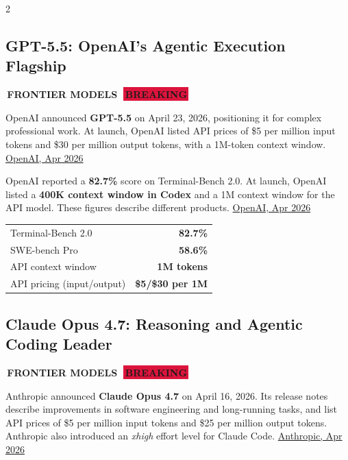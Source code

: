 \documentclass[10pt, a4paper]{article}
\newcommand{\sectiontag}[1]{%
  \noindent\colorbox{cobalt}{%
    \,\footnotesize\bfseries\color{white}\MakeUppercase{#1}\,}\,%
}
\newcommand{\hottag}{%
  \colorbox{crimson}{\,\scriptsize\bfseries\color{white}BREAKING\,}\ %
}
\newcommand{\ruled}{%
  \par\vspace{0.3em}%
  \noindent{\color{electric}\rule{\linewidth}{0.4pt}}\par
  \vspace{0.3em}}
\begin{document}
\begin{multicols}{2}

\subsection{GPT-5.5: OpenAI's Agentic Execution Flagship}

\sectiontag{Frontier Models}\quad\hottag

\medskip
{\small
OpenAI announced \textbf{GPT-5.5} on April 23, 2026, positioning it for complex professional work. At launch, OpenAI listed API prices of \$5 per million input tokens and \$30 per million output tokens, with a 1M-token context window.
\href{https://openai.com/index/introducing-gpt-5-5/}{OpenAI, Apr 2026}

OpenAI reported a \textbf{82.7\%} score on Terminal-Bench 2.0. At launch, OpenAI listed a \textbf{400K context window in Codex} and a 1M context window for the API model. These figures describe different products.
\href{https://openai.com/index/introducing-gpt-5-5/}{OpenAI, Apr 2026}
}

\begin{statbox}[title={\faChartLine\quad GPT-5.5 Key Benchmarks}]
  \begin{center}
  \begin{tabular}{l r}
    \small Terminal-Bench 2.0 & \small \textbf{82.7\%} \\
    \small SWE-bench Pro      & \small \textbf{58.6\%} \\
    \small API context window & \small \textbf{1M tokens} \\
    \small API pricing (input/output) & \small \textbf{\$5/\$30 per 1M} \\
  \end{tabular}
  \end{center}
\end{statbox}

\ruled

\subsection{Claude Opus 4.7: Reasoning and Agentic Coding Leader}

\sectiontag{Frontier Models}\quad\hottag

\medskip
{\small
Anthropic announced \textbf{Claude Opus 4.7} on April 16, 2026. Its release notes describe improvements in software engineering and long-running tasks, and list API prices of \$5 per million input tokens and \$25 per million output tokens. Anthropic also introduced an \textit{xhigh} effort level for Claude Code.
\href{https://www.anthropic.com/news/claude-opus-4-7}{Anthropic, Apr 2026}

}
\end{multicols}
\end{document}
